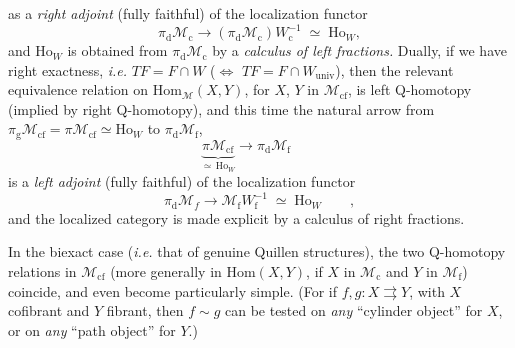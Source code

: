 \documentclass[11pt]{article}
\newcommand{\printedpage}[1]{\marginpar{\footnotesize p.~#1}}
\newcommand{\msp}[1]{\marginpar{\footnotesize [#1]}}
\newcommand{\cM}{\mathcal{M}}
\begin{document}
\setcounter{footnote}{23}

\printedpage{19}
\msp{page 31}
as a \textit{right adjoint} (fully faithful) of the localization functor
\[
\pi_{\mathrm{d}}\cM_{\mathrm{c}} \longrightarrow (\pi_{\mathrm{d}}\cM_{\mathrm{c}})W_{\mathrm{c}}^{-1} \;\simeq\; \mathrm{Ho}_W,
\]
and $\mathrm{Ho}_W$ is obtained from $\pi_{\mathrm{d}}\cM_{\mathrm{c}}$ by a \textit{calculus of left fractions.} Dually, if we have right exactness, \textit{i.e.} $TF = F\cap W$ ($\Longleftrightarrow$ $TF = F\cap W_{\mathrm{univ}}$), then the relevant equivalence relation on $\mathrm{Hom}_{\cM}(X,Y)$, for $X$, $Y$ in $\cM_{\mathrm{cf}}$, is left Q-homotopy (implied by right Q-homotopy), and this time the natural arrow from $\pi_{\mathrm{g}}\cM_{\mathrm{cf}} = \pi\cM_{\mathrm{cf}} \simeq \mathrm{Ho}_W$ to $\pi_{\mathrm{d}}\cM_{\mathrm{f}}$,
\[
\underbrace{\pi\cM_{\mathrm{cf}}}_{\simeq\,\mathrm{Ho}_W} \longrightarrow \pi_{\mathrm{d}}\cM_{\mathrm{f}} \qquad
\]
is a \textit{left adjoint} (fully faithful) of the localization functor
\[
\pi_{\mathrm{d}}\cM_f \longrightarrow \cM_{\mathrm{f}}W_{\mathrm{f}}^{-1} \;\simeq\; \mathrm{Ho}_W \qquad, %
\]
and the localized category is made explicit by a calculus of right fractions.

In the biexact case (\textit{i.e.} that of genuine Quillen structures), the two Q-homotopy relations in $\cM_{\mathrm{cf}}$ (more generally in $\mathrm{Hom}(X,Y)$, if $X$ in $\cM_{\mathrm{c}}$ and $Y$ in $\cM_{\mathrm{f}}$)
\msp{page 32}
coincide, and even become particularly simple. (For if $f, g : X \rightrightarrows Y$, with $X$ cofibrant and $Y$ fibrant, then $f\sim g$ can be tested on \textit{any} ``cylinder object'' for $X$, or on \textit{any} ``path object'' for $Y$.)
\end{document}
